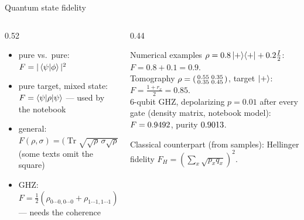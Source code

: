 \documentclass[aspectratio=169,11pt]{beamer}
\begin{document}
\begin{frame}[label=fFid]{Quantum state fidelity}
  \begin{columns}[T]
    \begin{column}{0.52\textwidth}
      \small
      \begin{itemize}\itemsep2pt
        \item pure vs.\ pure: $F = |\braket{\psi|\phi}|^2$
        \item pure target, mixed state: $F = \braket{\psi|\rho|\psi}$ --- used by the notebook
        \item general: $F(\rho, \sigma) = \big(\operatorname{Tr}\sqrt{\sqrt\rho\,\sigma\sqrt\rho}\big)^2$ (some texts omit the square)
        \item GHZ: $F = \frac12(\rho_{0\cdots0,0\cdots0} + \rho_{1\cdots1,1\cdots1}) + \operatorname{Re}\rho_{0\cdots0,1\cdots1}$ --- needs the coherence
      \end{itemize}
    \end{column}
    \begin{column}{0.44\textwidth}
      \begin{exampleblock}{Numerical examples}
        \scriptsize
        $\rho = 0.8\ket+\!\bra+ + 0.2\frac I2$: $F = 0.8 + 0.1 = 0.9$.\\[2pt]
        Tomography $\rho = \begin{psmallmatrix}0.55&0.35\\0.35&0.45\end{psmallmatrix}$, target $\ket+$: $F = \frac{1 + r_x}{2} = 0.85$.\\[2pt]
        6-qubit GHZ, depolarizing $p = 0.01$ after every gate (density matrix, notebook model): $F = 0.9492$, purity $0.9013$.
      \end{exampleblock}
      \scriptsize Classical counterpart (from samples): Hellinger fidelity $F_H = (\sum_x\sqrt{p_xq_x})^2$.
    \end{column}
  \end{columns}
\end{frame}
\end{document}

